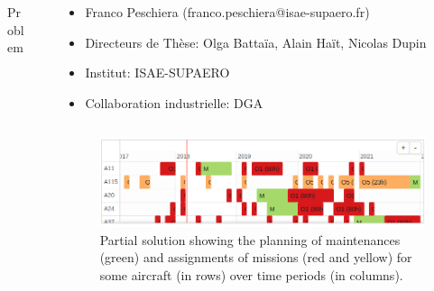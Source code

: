 \documentclass[final]{beamer}
\newlength{\sepwid}
\newlength{\onecolwid}
\newlength{\twocolwid}
\begin{document}
\begin{frame}[t]
\begin{columns}[t]
\begin{column}{\onecolwid}
\begin{block}{Problem}
		\end{block}

	\end{column} %

	\begin{column}{\sepwid}\end{column} %

	\begin{column}{\twocolwid} %


	\begin{column}{\onecolwid}\end{column} %

	\begin{column}{\twocolwid}
			\vspace*{-6ex}
			\begin{alertblock}{}				
				\begin{itemize}
					\item Franco Peschiera (franco.peschiera@isae-supaero.fr)
					\item Directeurs de Thèse: Olga Battaïa, Alain Haït, Nicolas Dupin
					\item Institut: ISAE-SUPAERO
					\item Collaboration industrielle: DGA
				\end{itemize}
			\end{alertblock}

	\end{column}

	\begin{column}{\onecolwid}\end{column} %

		\begin{figure}
			\includegraphics[width=1\linewidth]{img/calendar2.png}
			\caption{Partial solution showing the planning of maintenances (green) and assignments of missions (red and yellow) for some aircraft (in rows) over time periods (in columns).}
		\end{figure}


\end{column}
\end{columns}
\end{frame}
\end{document}
